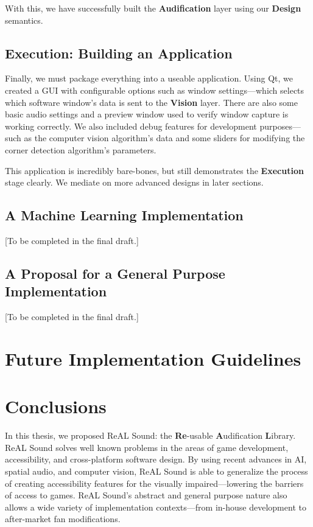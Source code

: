 \documentclass{report}
\newcommand{\rs}{ReAL Sound\xspace}
\newcommand{\rsfull}{\textbf{Re}-usable \textbf{A}udification \textbf{L}ibrary\xspace}
\newcommand{\design}{\textbf{Design}\xspace}
\newcommand{\exec}{\textbf{Execution}\xspace}
\newcommand{\vision}{\textbf{Vision}\xspace}
\newcommand{\audio}{\textbf{Audification}\xspace}
\begin{document}
With this, we have successfully built the \audio layer using our \design semantics. 

\section {Execution: Building an Application}
Finally, we must package everything into a useable application. Using Qt, we created a GUI with configurable options such as window settings---which selects which software window's data is sent to the \vision layer. There are also some basic audio settings and a preview window used to verify window capture is working correctly. We also included debug features for development purposes---such as the computer vision algorithm's data and some sliders for modifying the corner detection algorithm's parameters.

This application is incredibly bare-bones, but still demonstrates the \exec stage clearly. We mediate on more advanced designs in later sections.

\section{A Machine Learning Implementation}
[To be completed in the final draft.]

\section{A Proposal for a General Purpose Implementation}
[To be completed in the final draft.]

\chapter{Future Implementation Guidelines} 


\chapter{Conclusions}
In this thesis, we proposed \rs: the \rsfull. \rs solves well known problems in the areas of game development, accessibility, and cross-platform software design. By using recent advances in AI, spatial audio, and computer vision, \rs is able to generalize the process of creating accessibility features for the visually impaired---lowering the barriers of access to games. \rs's abstract and general purpose nature also allows a wide variety of implementation contexts---from in-house development to after-market fan modifications.
\end{document}
